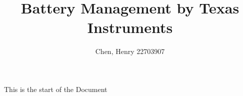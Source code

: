 \documentclass[]{article}
\author{Chen, Henry 22703907}
\title{Battery Management by Texas Instruments}
\begin{document}
\maketitle
This is the start of the Document
\end{document}
